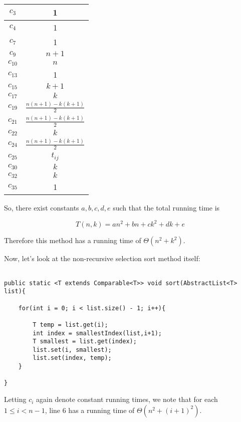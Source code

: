 \documentclass{article}
\begin{document}
\begin{tabular}{|c|c|}
\hline 
$c_3$ & 1 \\ 
\hline 
$c_4$ & 1 \\ 
\hline 
$c_7$ & 1 \\ 
\hline 
$c_9$ & $n+1$ \\ 
\hline 
$c_{10}$ & $n$ \\ 
\hline 
$c_{13}$ & 1 \\ 
\hline 
$c_{15}$ & $k+1$ \\ 
\hline 
$c_{17}$ & $k$ \\ 
\hline 
$c_{19}$ &  $\frac{n(n+1) - k(k+1)}{2}$ \\ 
\hline 
$c_{21}$ & $\frac{n(n+1) - k(k+1)}{2}$ \\ 
\hline 
$c_{22}$ & $k$ \\ 
\hline 
$c_{24}$ & $\frac{n(n+1) - k(k+1)}{2}$ \\ 
\hline 
$c_{25}$ & $t_{ij}$ \\ 
\hline 
$c_{30}$ & $k$ \\ 
\hline 
$c_{32}$ & $k$ \\ 
\hline 
$c_{35}$ & 1 \\ 
\hline 
\end{tabular} 

\bigskip
\bigskip

So, there exist constants $a,b,c,d,e$ such that the total running time is

\[
	T(n,k) = a n^2 + bn + ck^2 + dk + e
\]

Therefore this method has a running time of $\Theta(n^2 + k^2)$.

Now, let's look at the non-recursive selection sort method itself:

\begin{verbatim}

public static <T extends Comparable<T>> void sort(AbstractList<T> list){
		
	for(int i = 0; i < list.size() - 1; i++){
		
		T temp = list.get(i);
		int index = smallestIndex(list,i+1);
		T smallest = list.get(index);
		list.set(i, smallest);
		list.set(index, temp);
	}
	
}

\end{verbatim}

\bigskip

Letting $c_i$ again denote constant running times, we note that for each $1\leq i < n-1$, line 6 has a running time of $\Theta\left(n^2 + (i+1)^2\right)$.
\end{document}
